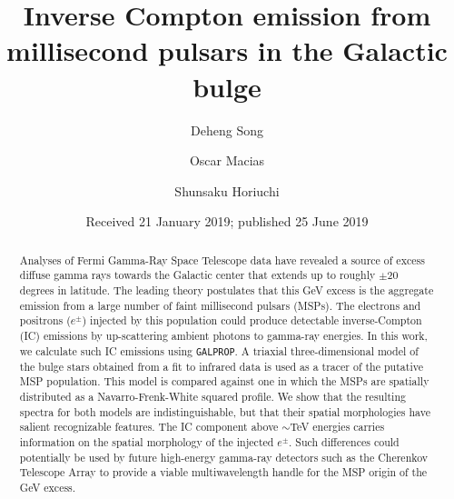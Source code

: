 \documentclass[%
reprint,
superscriptaddress,
amsmath,amssymb,
aps,
floatfix,
]{revtex4-1}
\begin{document}

\title{Inverse Compton emission from millisecond pulsars in the Galactic bulge}%

\author{Deheng Song}
\author{Oscar Macias}
\author{Shunsaku Horiuchi}

\date{Received 21 January 2019; published 25 June 2019}%
\begin{abstract}
Analyses of Fermi Gamma-Ray Space Telescope data have revealed a source of excess diffuse gamma rays towards the Galactic center that extends up to roughly $\pm$20 degrees in latitude. The leading theory postulates that this GeV excess is the aggregate emission from a large number of faint millisecond pulsars (MSPs). The electrons and positrons ($e^\pm$) injected by this population could produce detectable inverse-Compton (IC) emissions by up-scattering ambient photons to gamma-ray energies. In this work, we calculate such IC emissions using \texttt{GALPROP}. A triaxial three-dimensional model of the bulge stars obtained from a fit to infrared data is used as a tracer of the putative MSP population. This model is compared against one in which the MSPs are spatially distributed as a Navarro-Frenk-White squared profile. We show that the resulting spectra for both models are indistinguishable, but that their spatial morphologies have salient recognizable features. The IC component above $\sim$TeV energies carries information on the spatial morphology of the injected $e^\pm$. Such differences could potentially be used by future high-energy gamma-ray detectors such as the Cherenkov Telescope Array to provide a viable multiwavelength handle for the MSP origin of the GeV excess.
\end{abstract}
\maketitle
\end{document}
